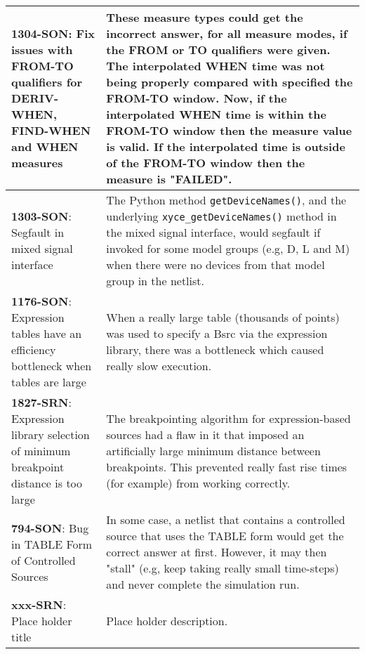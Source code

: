 {\begin{longtable}[h] {>{\raggedright\small}m{2in}|>{\raggedright\let\\\tabularnewline\small}m{3.5in}}
\textbf{1304-SON}: Fix issues with FROM-TO qualifiers for DERIV-WHEN,
FIND-WHEN and WHEN measures & These measure types could get the incorrect
answer, for all measure modes, if the FROM or TO qualifiers
were given.  The interpolated WHEN time was not being properly compared with
specified the FROM-TO window.  Now, if the interpolated WHEN time is within
the FROM-TO window then the measure value is valid.  If the interpolated
time is outside of the FROM-TO window then the measure is "FAILED".
\\ \hline

\textbf{1303-SON}: Segfault in mixed signal interface &
The Python method \texttt{getDeviceNames()}, and the underlying
\texttt{xyce\_getDeviceNames()} method in the mixed signal interface,
would segfault if invoked for some model groups (e.g, D, L and M) when
there were no devices from that model group in the \Xyce{} netlist.
\\ \hline

\textbf{1176-SON}: Expression tables have an efficiency bottleneck when tables are large &
When a really large table (thousands of points) was used to specify a Bsrc 
via the expression library, there was a bottleneck which caused really slow execution.
\\ \hline

\textbf{1827-SRN}: Expression library selection of minimum breakpoint distance is too large &
The breakpointing algorithm for expression-based sources had a flaw in it that 
imposed an artificially large minimum distance between breakpoints.  This 
prevented really fast rise times (for example) from working correctly.
\\ \hline

\textbf{794-SON}: Bug in TABLE Form of \Xyce{} Controlled Sources & 
In some case, a \Xyce{} netlist that contains a controlled source that uses the 
TABLE form would get the correct answer at first.  However, it may then "stall" 
(e.g, keep taking really small time-steps) and never complete the simulation run.
\\ \hline

\textbf{xxx-SRN}: Place holder title &
Place holder description.  \\ \hline
\end{longtable}
}
